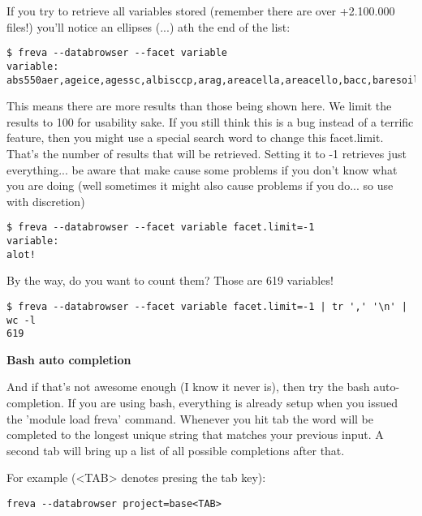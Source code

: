 \documentclass[a4paper,11pt]{ltxdoc}
\begin{document}
If you try to retrieve all variables stored (remember there are over +2.100.000 files!) you'll notice an ellipses (...) ath the end of the list:
\begin{lstlisting}
$ freva --databrowser --facet variable
variable: abs550aer,ageice,agessc,albisccp,arag,areacella,areacello,bacc,baresoilfrac,basin,bddtalk,bddtdic,bddtdife,bddtdin,bddtdip,bddtdisi,bfe,bmelt,bsi,burntarea,c3pftfrac,c4pftfrac,calc,ccb,cct,ccwd,cdnc,cfad2lidarsr532,cfaddbze94,cfadlidarsr532,cfc11,cfc113global,cfc11global,cfc12global,ch4,ch4global,chl,chlcalc,chldiat,chldiaz,chlmisc,chlpico,ci,cl,clc,clcalipso,clcalipso2,clccalipso,cldnci,cldncl,cldnvi,cleaf,clhcalipso,cli,clic,clis,clisccp,clitter,clitterabove,clitterbelow,clivi,cllcalipso,clmcalipso,clrcalipso,cls,clt,cltc,cltcalipso,cltisccp,cltnobs,cltstddev,clw,clwc,clws,clwvi,cmisc,co2,co2mass,co3,co3satarag,co3satcalc,concaerh2o,concbb,concbc,conccn,concdms,concdust,concnh4,concno3,concoa,concpoa,concso2,concso4,concsoa,concss,cproduct,croot,cropfrac,csoil,csoilfast...
\end{lstlisting}
This means there are more results than those being shown here. We limit the results to 100 for usability sake. If you still think this is a bug instead of a terrific feature, then you might use a special search word to change this facet.limit. That's the number of results that will be retrieved. Setting it to -1 retrieves just everything... be aware that make cause some problems if you don't know what you are doing (well sometimes it might also cause problems if you do... so use with discretion)
\begin{lstlisting}
$ freva --databrowser --facet variable facet.limit=-1
variable:
alot!
\end{lstlisting} 
By the way, do you want to count them? Those are 619 variables!
\begin{lstlisting}
$ freva --databrowser --facet variable facet.limit=-1 | tr ',' '\n' | wc -l
619
\end{lstlisting}

\textbf{Bash auto completion}

And if that's not awesome enough (I know it never is), then try the bash auto-completion. If you are using bash, everything is already setup when you issued the 'module load freva' command. Whenever you hit tab the word will be completed to the longest unique string that matches your previous input. A second tab will bring up a list of all possible completions after that.

For example (<TAB> denotes presing the tab key):
\begin{lstlisting}
freva --databrowser project=base<TAB>
\end{lstlisting}
\end{document}
